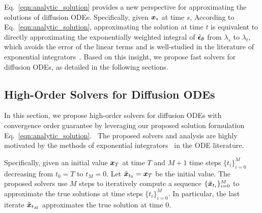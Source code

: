 Eq.~\eqref{eqn:analytic_solution} provides a new perspective for approximating the solutions of diffusion ODEs.
Specifically, given $\bm{x}_s$ at time $s$, According to Eq.~\eqref{eqn:analytic_solution}, approximating the solution at time $t$ is equivalent to directly approximating the exponentially weighted integral of $\hat{\bm{\epsilon}}_\theta$ from $\lambda_s$ to $\lambda_t$, which avoids the error of the linear terms and is well-studied in the literature of exponential integrators~\citep{hochbruck2010exponential,hochbruck2005explicit}. Based on this insight, we propose fast solvers for diffusion ODEs, as detailed in the following sections.





\subsection{High-Order Solvers for Diffusion ODEs}
\label{sec:high-order}
In this section, we propose high-order solvers for diffusion ODEs with convergence order guarantee by leveraging our proposed solution formulation Eq.~\eqref{eqn:analytic_solution}.~
The proposed solvers and analysis are highly motivated by the methods of exponential integrators~\citep{hochbruck2010exponential,hochbruck2005explicit} in the ODE literature.


Specifically, given an initial value $\bm{x}_T$ at time $T$ and $M+1$ time steps $\{t_i\}_{i=0}^{M}$ decreasing from $t_0=T$ to $t_{M}=0$. Let $\tilde{\bm{x}}_{t_0}=\bm{x}_T$ be the initial value. 
The proposed solvers use $M$ steps to iteratively compute a sequence $\{\tilde{\bm{x}}_{t_i}\}_{i=0}^{M}$
to approximate the true solutions at time steps $\{ t_{i} \}_{i=0}^M$. In particular, the last iterate $\tilde{\bm{x}}_{t_M}$ approximates the true solution at time $0$.

